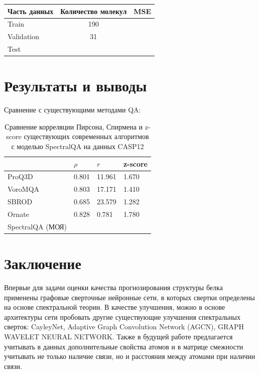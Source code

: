 \documentclass[12pt,twosides]{article}
\begin{document}
	\begin{table}[H]
		\centering
		\begin{tabular}{lcr}
			\hline Часть данных & Количество молекул & MSE  \\
			\hline Train & 190 &  \\
			Validation & 31 &   \\
			Test &  &  \\
			\hline
		\end{tabular}
	\end{table}
	
	\section{Результаты и выводы}
	
	Сравнение с существующими методами QA:
	\begin{center}
		\begin{table}[H]
			\centering
			\begin{tabular}{l|l|l|l}
				\hline
				& $\rho$ &  $r$     &    z-score \\ \hline
				ProQ3D     & 0.801  &     11.961     & 1.670       \\
				VoroMQA    & 0.803  &   17.171     & 1.410       \\  
				SBROD      & 0.685  &    23.579     & 1.282       \\
				Ornate     & 0.828  &  0.781    & 1.780       \\
				SpectralQA (МОЯ)&   &      &     
			\end{tabular}
			\caption{Сравнение корреляции Пирсона, Спирмена и z-score существующих современных алгоритмов с моделью SpectralQA на данных CASP12}
			\label{Tab:1}
		\end{table}
	\end{center}
	
	\section{Заключение}
	Впервые для задачи оценки качества прогнозирования структуры белка применены графовые сверточные нейронные сети, в которых свертки определены на основе спектральной теории. В качестве улучшения, можно в основе архитектуры сети пробовать другие существующие улучшения спектральных сверток: CayleyNet, Adaptive Graph Convolution Network (AGCN), GRAPH WAVELET NEURAL NETWORK. Также в будущей работе предлагается учитывать в данных дополнительные свойства атомов и в матрице смежности учитывать не только наличие связи, но и расстояния между атомами при наличии связи.
	
	
	\nocite{*}
	
	
\end{document}
